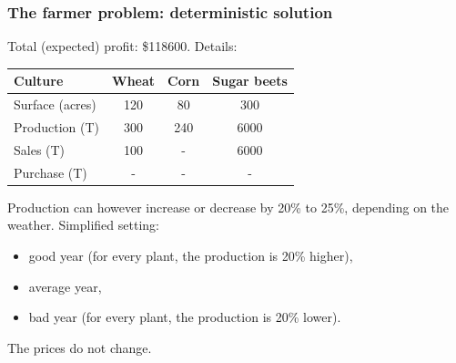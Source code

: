 \documentclass{beamer}
\begin{document}
\begin{frame}
\frametitle{The farmer problem: deterministic solution}

Total (expected) profit: \$118600. Details:
\begin{center}
\begin{tabular}{lccc}
\hline
Culture & Wheat & Corn & Sugar beets \\
\hline
Surface (acres) & 120 & 80 & 300 \\
Production (T) & 300 & 240 & 6000 \\
Sales (T) & 100 & - & 6000 \\
Purchase (T) & - & - & - \\
\hline
\end{tabular}
\end{center}

\mbox{}

Production can however increase or decrease by 20\% to 25\%, depending on the weather.
Simplified setting:
\begin{itemize}
	\item 
good year (for every plant, the production is 20\% higher),
\item
average year,
\item
bad year (for every plant, the production is 20\% lower).
\end{itemize}
The prices do not change.
\end{frame}
\end{document}
